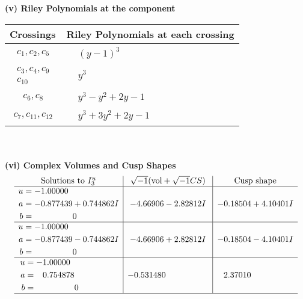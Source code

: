 \documentclass[1p]{elsarticle_modified}
\theoremstyle{definition}
\newcommand{\I}{\sqrt{-1}}
\begin{document}
\newpage\renewcommand{\arraystretch}{1}
\flushleft \textbf{(v) Riley Polynomials at the component}\newline \\
\begin{tabular}{m{50pt}|m{274pt}}
Crossings & \hspace{64pt}Riley Polynomials at each crossing \\
\hline $$\begin{aligned}c_{1},c_{2},c_{5}\end{aligned}$$&$\begin{aligned}
&(y-1)^3
\end{aligned}$\\
\hline $$\begin{aligned}c_{3},c_{4},c_{9}\\c_{10}\end{aligned}$$&$\begin{aligned}
&y^3
\end{aligned}$\\
\hline $$\begin{aligned}c_{6},c_{8}\end{aligned}$$&$\begin{aligned}
&y^3- y^2+2 y-1
\end{aligned}$\\
\hline $$\begin{aligned}c_{7},c_{11},c_{12}\end{aligned}$$&$\begin{aligned}
&y^3+3 y^2+2 y-1
\end{aligned}$\\
\hline
\end{tabular}\\~\\
\newpage\flushleft \textbf{(vi) Complex Volumes and Cusp Shapes}
$$\begin{array}{c|c|c}  
\text{Solutions to }I^u_{3}& \I (\text{vol} + \sqrt{-1}CS) & \text{Cusp shape}\\
 \hline 
\begin{aligned}
u &= -1.00000\phantom{ +0.000000I} \\
a &= -0.877439 + 0.744862 I \\
b &= \phantom{-0.000000 } 0\end{aligned}
 & -4.66906 - 2.82812 I & -0.18504 + 4.10401 I \\ \hline\begin{aligned}
u &= -1.00000\phantom{ +0.000000I} \\
a &= -0.877439 - 0.744862 I \\
b &= \phantom{-0.000000 } 0\end{aligned}
 & -4.66906 + 2.82812 I & -0.18504 - 4.10401 I \\ \hline\begin{aligned}
u &= -1.00000\phantom{ +0.000000I} \\
a &= \phantom{-}0.754878\phantom{ +0.000000I} \\
b &= \phantom{-0.000000 } 0\end{aligned}
 & -0.531480\phantom{ +0.000000I} & \phantom{-}2.37010\phantom{ +0.000000I}\\
 \hline 
 \end{array}$$\newpage
\end{document}
